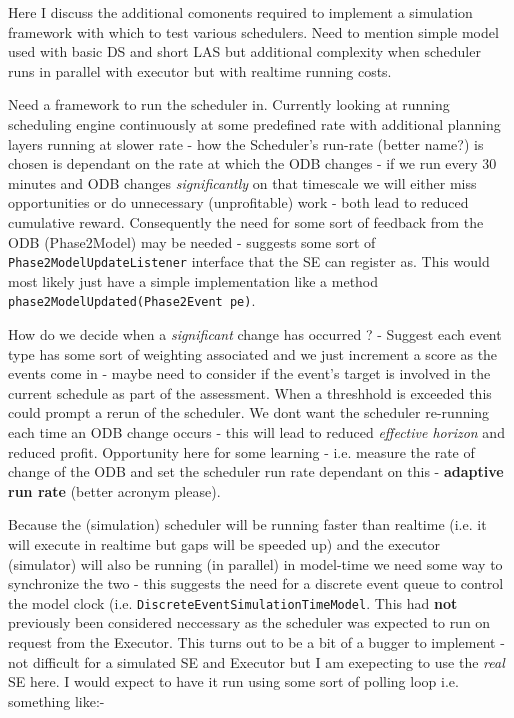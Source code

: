 Here I discuss the additional comonents required to implement a simulation framework with which to test various schedulers. Need to mention simple model used with basic DS and short LAS but additional complexity when scheduler runs in parallel with executor but with realtime running costs.


Need a framework to run the scheduler in. Currently looking at running scheduling engine continuously at some predefined rate with additional planning layers running at slower rate - how the Scheduler's run-rate (better name?) is chosen is dependant on the rate at which the ODB changes - if we run every 30 minutes and ODB changes \emph{significantly} on that timescale we will either miss opportunities or do unnecessary (unprofitable) work - both lead to reduced cumulative reward. Consequently the need for some sort of feedback from the ODB (Phase2Model) may be needed - suggests some sort of {\tt Phase2ModelUpdateListener} interface that the SE can register as. This would most likely just have a simple implementation like a method {\tt phase2ModelUpdated(Phase2Event pe)}. 

How do we decide when a \emph{significant} change has occurred ? -  Suggest each event type has some sort of weighting associated and we just increment a score as the events come in - maybe need to consider if the event's target is involved in the current schedule as part of the assessment. When a threshhold is exceeded this could prompt a rerun of the scheduler. We dont want the scheduler re-running each time an ODB change occurs - this will lead to reduced \emph{effective horizon} and reduced profit. Opportunity here for some learning - i.e. measure the rate of change of the ODB and set the scheduler run rate dependant on this - {\bf adaptive run rate} (better acronym please).

Because the (simulation) scheduler will be running faster than realtime (i.e. it will execute in realtime but gaps will be speeded up) and the executor (simulator) will also be running (in parallel) in model-time we need some way to synchronize the two - this suggests the need for a discrete event queue to control the model clock (i.e. {\tt DiscreteEventSimulationTimeModel}. This had {\bf not} previously been considered neccessary as the scheduler was expected to run on request from the Executor. This turns out to be a bit of a bugger to implement - not difficult for a simulated SE and Executor but I am exepecting to use the \emph{real} SE here. I would expect to have it run using some sort of polling loop i.e. something like:-

